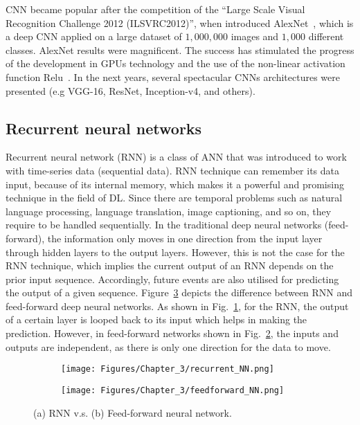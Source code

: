 CNN became popular after the competition of the \enquote{Large Scale Visual Recognition Challenge 2012 (ILSVRC2012)}, when \textcite{Krizhevsky2012} introduced AlexNet~\cite{Krizhevsky2012}, which is a deep CNN applied on a large dataset of \(1,000,000\) images and \(1,000\) different classes.
AlexNet results were magnificent. 
The success has stimulated the progress of the development in GPUs technology and the use of the non-linear activation function Relu~\cite{Lecun2015}.
In the next years, several spectacular CNNs architectures were presented (e.g VGG-16, ResNet, Inception-v4, and others).
\subsection{Recurrent neural networks}
\label{sec222}
Recurrent neural network (RNN) is a class of ANN that was introduced to work with time-series data (sequential data).
RNN technique can remember its data input, because of its internal memory, which makes it a powerful and promising technique in the field of DL.
Since there are temporal problems such as natural language processing, language translation, image captioning, and so on, they require to be handled sequentially.
In the traditional deep neural networks (feed-forward), the information only moves in one direction from the input layer through hidden layers to the output layers.
However, this is not the case for the RNN technique, which implies the current output of an RNN depends on the prior input sequence.
Accordingly, future events are also utilised for predicting the output of a given sequence.
Figure~\ref{fig:rnn_vs_FFNN} depicts the difference between RNN and feed-forward deep neural networks.
As shown in Fig.~\ref{fig:rrn}, for the RNN, the output of a certain layer is looped back to its input which helps in making the prediction.
However, in feed-forward networks shown in Fig.~\ref{fig:FFNN}, the inputs and outputs are independent, as there is only one direction for the data to move.
\begin{figure}[!ht]
	\centering
	\begin{subfigure}{0.49\textwidth}		
		\centering
		\texttt{[image: Figures/Chapter\_3/recurrent\_NN.png]}
		\caption{} 
		\label{fig:rrn}
	\end{subfigure}
	\hfill
	\begin{subfigure}{0.49\textwidth}
		\centering
		\texttt{[image: Figures/Chapter\_3/feedforward\_NN.png]}
		\caption{} 
		\label{fig:FFNN}
	\end{subfigure}	
	\caption{(a) RNN v.s. (b) Feed-forward neural network.}
	\label{fig:rnn_vs_FFNN}
\end{figure}


